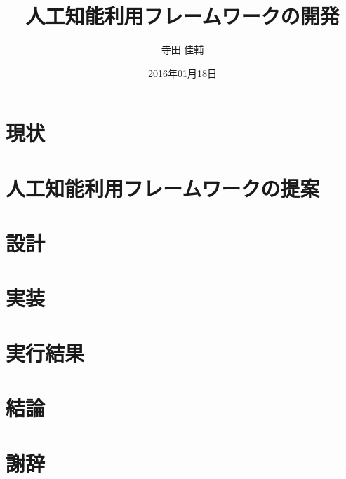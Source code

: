 \documentclass[a4paper,10pt,onecolumn,oneside,openany]{jsbook}
\author{寺田 佳輔}										%
\title{人工知能利用フレームワークの開発}				%
\date{2016年01月18日}									%
\begin{document}



\chapter{現状}




\chapter{人工知能利用フレームワークの提案}



\chapter{設計}


\chapter{実装}

\chapter{実行結果}

\chapter{結論}


\chapter*{謝辞}



\end{document}

